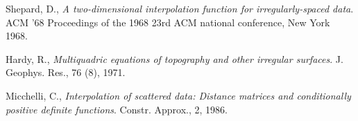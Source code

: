 \documentclass[a4paper, 10pt]{article}
\begin{document}
\lstlistoflistings

\listoffigures

\begin{thebibliography}{5}

  Shepard, D.,
  \emph{A two-dimensional interpolation function for irregularly-spaced data}.
  ACM '68 Proceedings of the 1968 23rd ACM national conference, New York
  1968.
  
  Hardy, R.,
  \emph{Multiquadric equations of topography and other irregular surfaces}.
  J. Geophys. Res., 76 (8),
  1971.
  
  Micchelli, C.,
  \emph{Interpolation of scattered data: Distance matrices and conditionally positive definite functions}.
  Constr. Approx., 2,
  1986.

\end{thebibliography}
\end{document}
